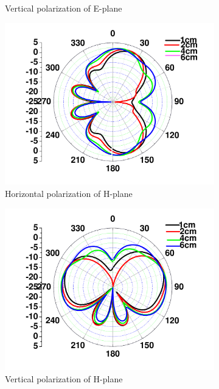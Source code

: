 \documentclass[journal]{IEEEtran}
\begin{document}
\begin{figure}[!htb]
\begin{subfigure}[b]{0.24\textwidth}
\caption{Vertical polarization of E-plane }
\label{fig:9b}
\end{subfigure}
\begin{subfigure}[b]{0.24\textwidth}
\includegraphics[width=\textwidth]{figs/9c.pdf}
\caption{Horizontal polarization of H-plane}
\label{fig:9d}	
\end{subfigure}
\begin{subfigure}[b]{0.24\textwidth}
\includegraphics[width=\textwidth]{figs/9d.pdf}
\caption{Vertical polarization of H-plane}
\label{fig:9e}	
\end{subfigure}
\begin{subfigure}[b]{0.24\textwidth}

\end{subfigure}
\end{figure}
\end{document}
